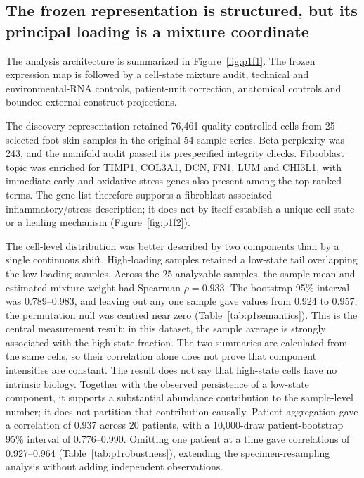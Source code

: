 \subsection{The frozen representation is structured, but its principal loading is a mixture coordinate}

The analysis architecture is summarized in Figure~\ref{fig:p1f1}\label{call:p1f1}. The frozen expression map is followed by a cell-state mixture audit, technical and environmental-RNA controls, patient-unit correction, anatomical controls and bounded external construct projections.


The discovery representation retained 76,461 quality-controlled cells from 25 selected foot-skin samples in the original 54-sample series. Beta perplexity was 243, and the manifold audit passed its prespecified integrity checks. Fibroblast topic was enriched for TIMP1, COL3A1, DCN, FN1, LUM and CHI3L1, with immediate-early and oxidative-stress genes also present among the top-ranked terms. The gene list therefore supports a fibroblast-associated inflammatory/stress description; it does not by itself establish a unique cell state or a healing mechanism (Figure~\ref{fig:p1f2}\label{call:p1f2}).



The cell-level distribution was better described by two components than by a single continuous shift. High-loading samples retained a low-state tail overlapping the low-loading samples. Across the 25 analyzable samples, the sample mean and estimated mixture weight had Spearman $\rho=0.933$. The bootstrap 95\% interval was 0.789--0.983, and leaving out any one sample gave values from 0.924 to 0.957; the permutation null was centred near zero (Table~\ref{tab:p1semantics}). This is the central measurement result: in this dataset, the sample average is strongly associated with the high-state fraction. The two summaries are calculated from the same cells, so their correlation alone does not prove that component intensities are constant. The result does not say that high-state cells have no intrinsic biology. Together with the observed persistence of a low-state component, it supports a substantial abundance contribution to the sample-level number; it does not partition that contribution causally. Patient aggregation gave a correlation of 0.937 across 20 patients, with a 10,000-draw patient-bootstrap 95\% interval of 0.776--0.990. Omitting one patient at a time gave correlations of 0.927--0.964 (Table~\ref{tab:p1robustness}), extending the specimen-resampling analysis without adding independent observations.

